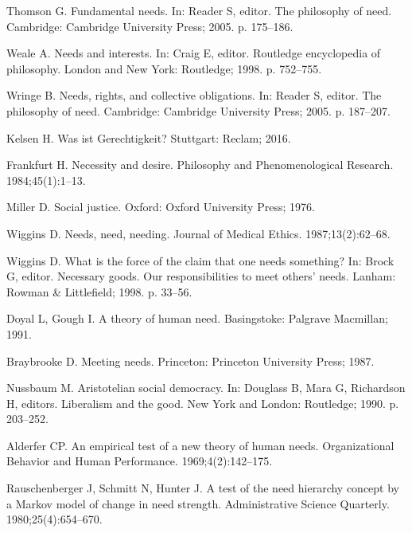 \documentclass[10pt,letterpaper]{article}
\begin{document}
\begin{thebibliography}{100}
Thomson G.
\newblock Fundamental needs.
\newblock In: Reader S, editor. The philosophy of need. Cambridge: Cambridge
  University Press; 2005. p. 175--186.

Weale A.
\newblock Needs and interests.
\newblock In: Craig E, editor. Routledge encyclopedia of philosophy. London and New York:
  Routledge; 1998. p. 752--755.

Wringe B.
\newblock Needs, rights, and collective obligations.
\newblock In: Reader S, editor. The philosophy of need. Cambridge: Cambridge
  University Press; 2005. p. 187--207.

Kelsen H.
\newblock Was ist {Gerechtigkeit}?
\newblock Stuttgart: Reclam; 2016.

Frankfurt H.
\newblock Necessity and desire.
\newblock Philosophy and Phenomenological Research. 1984;45(1):1--13.

Miller D.
\newblock Social justice.
\newblock Oxford: Oxford University Press; 1976.

Wiggins D.
\newblock Needs, need, needing.
\newblock Journal of Medical Ethics. 1987;13(2):62--68.

Wiggins D.
\newblock What is the force of the claim that one needs something?
\newblock In: Brock G, editor. Necessary goods. {Our} responsibilities to meet
  others' needs. Lanham: Rowman \& Littlefield; 1998. p. 33--56.

Doyal L, Gough I.
\newblock A theory of human need.
\newblock Basingstoke: Palgrave Macmillan; 1991.

Braybrooke D.
\newblock Meeting needs.
\newblock Princeton: Princeton University Press; 1987.

Nussbaum M.
\newblock Aristotelian social democracy.
\newblock In: Douglass B, Mara G, Richardson H, editors. Liberalism and the
  good. New York and London: Routledge; 1990. p. 203--252.

Alderfer CP.
\newblock An empirical test of a new theory of human needs.
\newblock Organizational Behavior and Human Performance. 1969;4(2):142--175.

Rauschenberger J, Schmitt N, Hunter J.
\newblock A test of the need hierarchy concept by a {Markov} model of change in
  need strength.
\newblock Administrative Science Quarterly. 1980;25(4):654--670.


\end{thebibliography}
\end{document}
